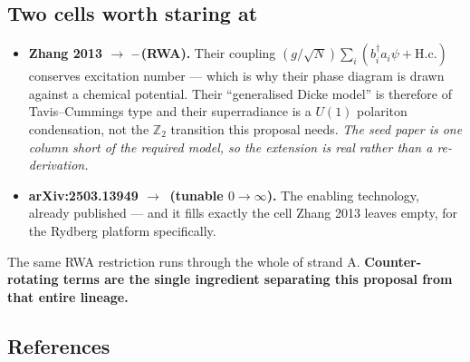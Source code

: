 \documentclass[10pt,a4paper,landscape]{article}
\newcommand{\nokey}{\textcolor{Rust}{\textbf{--}}}
\newcommand{\yeskey}{\textcolor{Rust}{\textbf{\checkmark}}}
\begin{document}
\vspace{-1mm}
\subsection*{\color{Navy} Two cells worth staring at}

\begin{itemize}[leftmargin=1.4em,itemsep=2pt]
  \item \textbf{Zhang 2013 $\rightarrow$ \nokey\,(RWA).} Their coupling
        $(g/\sqrt N)\sum_i(b_i^\dagger a_i\psi+\mathrm{H.c.})$ conserves excitation number --- which is why their
        phase diagram is drawn against a chemical potential. Their ``generalised Dicke model'' is therefore of
        Tavis--Cummings type and their superradiance is a $U(1)$ polariton condensation, not the $\mathbb{Z}_2$
        transition this proposal needs. \emph{The seed paper is one column short of the required model, so the
        extension is real rather than a re-derivation.}
  \item \textbf{arXiv:2503.13949 $\rightarrow$ \yeskey\,(tunable $0\!\to\!\infty$).} The enabling technology,
        already published --- and it fills exactly the cell Zhang 2013 leaves empty, for the Rydberg platform
        specifically.
\end{itemize}

\noindent The same RWA restriction runs through the whole of strand A. \textbf{Counter-rotating terms are the
single ingredient separating this proposal from that entire lineage.}

\vspace{1mm}
\subsection*{\color{Navy} References}
\end{document}
